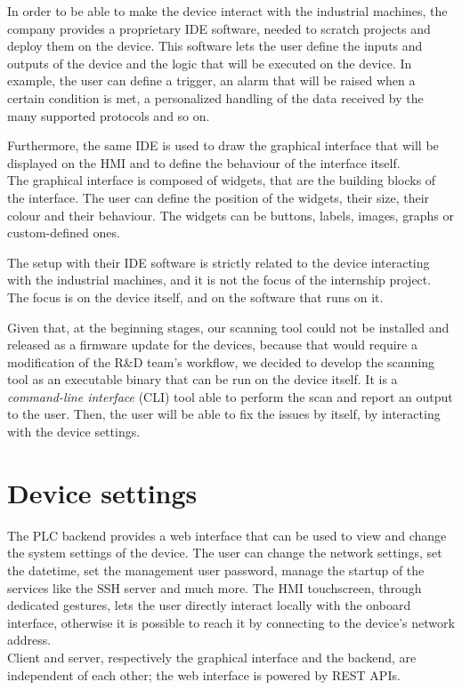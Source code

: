 In order to be able to make the device interact with the industrial machines, the company provides a proprietary IDE software, needed to scratch projects and deploy them on the device. This software lets the user define the inputs and outputs of the device and the logic that will be executed on the device. In example, the user can define a trigger, an alarm that will be raised when a certain condition is met, a personalized handling of the data received by the many supported protocols and so on.

Furthermore, the same IDE is used to draw the graphical interface that will be displayed on the HMI and to define the behaviour of the interface itself.\\
The graphical interface is composed of widgets, that are the building blocks of the interface. The user can define the position of the widgets, their size, their colour and their behaviour. The widgets can be buttons, labels, images, graphs or custom-defined ones.

The setup with their IDE software is strictly related to the device interacting with the industrial machines, and it is not the focus of the internship project. The focus is on the device itself, and on the software that runs on it.

Given that, at the beginning stages, our scanning tool could not be installed and released as a firmware update for the devices, because that would require a modification of the R\&D team's workflow, we decided to develop the scanning tool as an executable binary that can be run on the device itself. It is a \textit{command-line interface} (CLI) tool able to perform the scan and report an output to the user. Then, the user will be able to fix the issues by itself, by interacting with the device settings.

\section{Device settings}

The PLC backend provides a web interface that can be used to view and change the system settings of the device. The user can change the network settings, set the datetime, set the management user password, manage the startup of the services like the SSH server and much more. The HMI touchscreen, through dedicated gestures, lets the user directly interact locally with the onboard interface, otherwise it is possible to reach it by connecting to the device's network address. \\
Client and server, respectively the graphical interface and the backend, are independent of each other; the web interface is powered by REST APIs.

